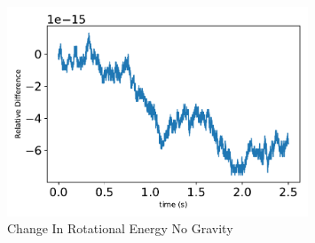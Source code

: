 \begin{figure}[htbp]\centerline{\includegraphics[width=0.8\textwidth]{AutoTeX/ChangeInRotationalEnergyNoGravity}}\caption{Change In Rotational Energy No Gravity}\label{fig:ChangeInRotationalEnergyNoGravity}\end{figure}